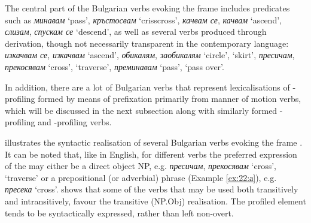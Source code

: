 \documentclass[output=paper,colorlinks,citecolor=brown]{langscibook}
\begin{document}
The central part of the Bulgarian verbs evoking the  frame includes predicates such as \textit{минавам} `pass’, \textit{кръстосвам} `crisscross’, \textit{качвам се}, \textit{качвам} `ascend’, \textit{слизам}, \textit{спускам се} `descend’, as well as several verbs produced through derivation, though not necessarily transparent in the contemporary language: \textit{изкачвам се}, \textit{изкачвам} `ascend’, \textit{обикалям}, \textit{заобикалям} `circle’, `skirt’, \textit{пресичам}, \textit{прекосявам} `cross’, `traverse’, \textit{преминавам} `pass’, `pass over’.

In addition, there are a lot of Bulgarian verbs that represent lexicalisations of -profiling formed by means of prefixation primarily from manner of motion verbs, which will be discussed in the next subsection along with similarly formed -profiling and -profiling verbs. 

 illustrates the syntactic realisation of several Bulgarian verbs evoking the frame . It can be noted that, like in English, for different verbs the preferred expression of the  may either be a direct object NP, e.g. \textit{пресичам}, \textit{прекосявам} `cross’, `traverse’ or a prepositional (or adverbial) phrase (Example \ref{ex:22:а}), e.g. \textit{пресека} `cross’.  shows that some of the verbs that may be used both transitively and intransitively, favour the transitive (NP.Obj) realisation. The profiled element tends to be syntactically expressed, rather than left non-overt.
\end{document}
